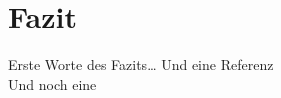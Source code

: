 
\chapter{Fazit}
\label{ch:fazit}



Erste Worte des Fazits\dots
Und eine Referenz \cite{kopetsch2010}\\
Und noch eine \cite{stat2050}
 